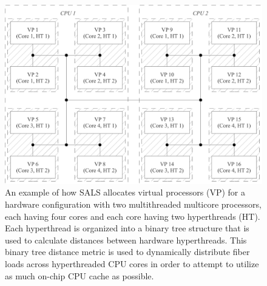 \begin{figure}
\centering
\includegraphics[width=12cm]{gfx/cpu_core_hyperthread_distances}
\caption[An example of how SALS allocates virtual processors for a
  hardware configuration with two multithreaded multicore
  processors.]{An example of how SALS allocates virtual processors
  (VP) for a hardware configuration with two multithreaded multicore
  processors, each having four cores and each core having two
  hyperthreads (HT).  Each hyperthread is organized into a binary tree
  structure that is used to calculate distances between hardware
  hyperthreads.  This binary tree distance metric is used to
  dynamically distribute fiber loads across hyperthreaded CPU cores in
  order to attempt to utilize as much on-chip CPU cache as possible.}
\label{figure:cpu_core_hyperthread_distances}
\end{figure}

